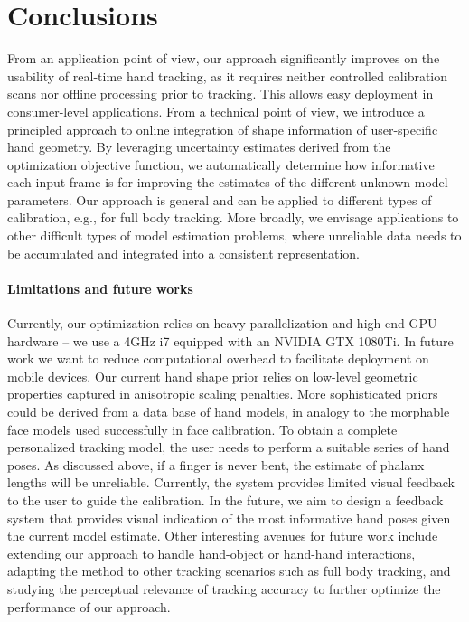 
\section{Conclusions}
From an application point of view, our approach significantly improves on the usability of real-time hand tracking, as it requires neither controlled calibration scans nor offline processing prior to tracking. This allows easy deployment in consumer-level applications. From a technical point of view, we introduce a principled approach to online integration of shape information of user-specific hand geometry. By leveraging uncertainty estimates derived from the optimization objective function, we automatically determine how informative each input frame is for improving the estimates of the different unknown model parameters. Our approach is general and can be applied to different types of calibration, e.g., for full body tracking. More broadly, we envisage applications to other difficult types of model estimation problems, where unreliable data needs to be accumulated and integrated into a consistent representation. 

\paragraph{Limitations and future works}
Currently, our optimization relies on heavy parallelization and high-end GPU hardware -- we use a 4GHz i7 equipped with an NVIDIA GTX 1080Ti. In future work we want to reduce computational overhead to facilitate deployment on mobile devices. Our current hand shape prior relies on low-level geometric properties captured in anisotropic scaling penalties.
More sophisticated priors could be derived from a data base of hand models, in analogy to the morphable face models used successfully in face calibration.
To obtain a complete personalized tracking model, the user needs to perform a suitable series of hand poses. As discussed above, if a finger is never bent, the estimate of phalanx lengths will be unreliable. Currently, the system provides limited visual feedback to the user to guide the calibration. In the future, we aim to design a feedback system that provides visual indication of the most informative hand poses given the current model estimate.
Other interesting avenues for future work include extending our approach to handle hand-object or hand-hand interactions, adapting the method to other tracking scenarios such as full body tracking, and studying the perceptual relevance of tracking accuracy to further optimize the performance of our approach.



